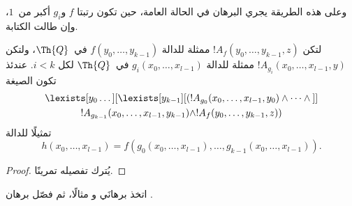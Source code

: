 \documentclass[../../../include/open-logic-section]{subfiles}
\begin{document}
وعلى هذه الطريقة يجري البرهان في الحالة العامة، حين تكون رتبتا
$f$ و$g_i$ أكبر من~$1$، وإن طالت الكتابة.

\begin{prop}
لتكن $!A_f(y_0,\dots,y_{k-1},z)$ ممثلة للدالة
$f(y_0,\dots,y_{k-1})$ في~$\Th{Q}$، ولتكن
$!A_{g_i}(x_0,\dots,x_{l-1},y)$ ممثلة للدالة
$g_i(x_0,\dots,x_{l-1})$ في~$\Th{Q}$ لكل $i<k$.
عندئذ تكون الصيغة
\begin{multline*}
  \lexists[y_0\dots][\lexists[y_{k-1}][(!A_{g_0}(x_0,\dots,x_{l-1},y_0) \land
      \dots \land {}]]\\
  !A_{g_{k-1}}(x_0,\dots,x_{l-1},y_{k-1}) \land !A_f(y_0,\dots,y_{k-1},z))
\end{multline*}
تمثيلًا للدالة
\[
h(x_0, \dots, x_{l-1}) = f(g_0(x_0, \dots, x_{l-1}), \dots, g_{k-1}(x_0,
\dots, x_{l-1})).
\]
\end{prop}

\begin{proof}
يُترك تفصيله تمرينًا.
\end{proof}

\begin{prob}
اتخذ برهانَي  و
 مثالًا، ثم فصّل برهان
.
\end{prob}
\end{document}
